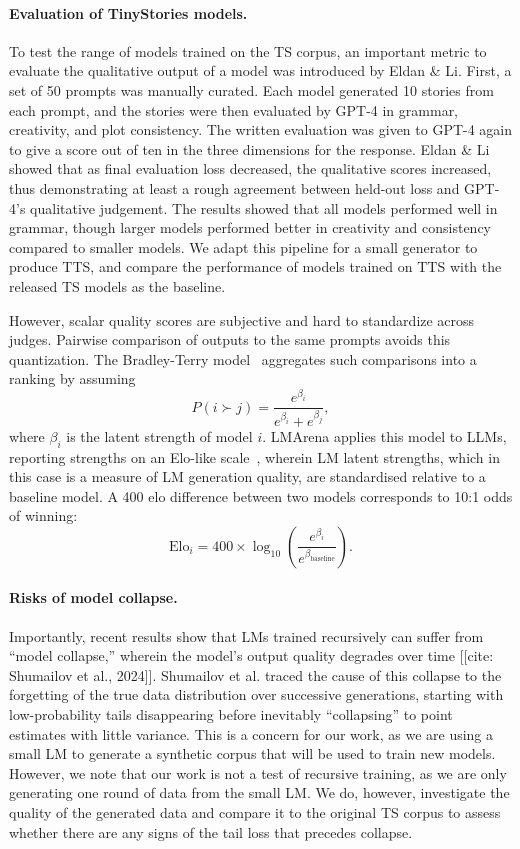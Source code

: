 \documentclass{article}
\begin{document}
\paragraph{Evaluation of TinyStories models.} To test the range of models trained on the TS corpus, an important metric to evaluate the qualitative output of a model was introduced by Eldan \& Li. First, a set of 50 prompts was manually curated. Each model generated 10 stories from each prompt, and the stories were then evaluated by GPT-4 in grammar, creativity, and plot consistency. The written evaluation was given to GPT-4 again to give a score out of ten in the three dimensions for the response. Eldan \& Li showed that as final evaluation loss decreased, the qualitative scores increased, thus demonstrating at least a rough agreement between held-out loss and GPT-4's qualitative judgement. The results showed that all models performed well in grammar, though larger models performed better in creativity and consistency compared to smaller models. We adapt this pipeline for a small generator to produce TTS, and compare the performance of models trained on TTS with the released TS models as the baseline. 

However, scalar quality scores are subjective and hard to standardize across judges. Pairwise comparison of outputs to the same prompts avoids this quantization. The Bradley-Terry model~\cite{bradley1952rank} aggregates such comparisons into a ranking by assuming
\begin{equation}
    P(i \succ j) = \frac{e^{\beta_i}}{e^{\beta_i} + e^{\beta_j}},
\end{equation}
where $\beta_i$ is the latent strength of model $i$. LMArena applies this model to LLMs, reporting strengths on an Elo-like scale~\cite{chiang2024chatbot}, wherein LM latent strengths, which in this case is a measure of LM generation quality, are standardised relative to a baseline model. A 400 elo difference between two models corresponds to 10:1 odds of winning:
\begin{equation}
    \text{Elo}_i = 400 \times \log_{10}\left(\frac{e^{\beta_i}}{e^{\beta_\text{baseline}}}\right).
\end{equation}

\paragraph{Risks of model collapse.} Importantly, recent results show that LMs trained recursively can suffer from ``model collapse,'' wherein the model's output quality degrades over time [[cite: Shumailov et al., 2024]]. Shumailov et al. traced the cause of this collapse to the forgetting of the true data distribution over successive generations, starting with low-probability tails disappearing before inevitably ``collapsing'' to point estimates with little variance. This is a concern for our work, as we are using a small LM to generate a synthetic corpus that will be used to train new models. However, we note that our work is not a test of recursive training, as we are only generating one round of data from the small LM. We do, however, investigate the quality of the generated data and compare it to the original TS corpus to assess whether there are any signs of the tail loss that precedes collapse.
\end{document}
